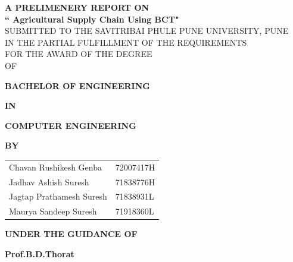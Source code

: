 \documentclass[oneside,a4paper,12pt]{report}
\begin{document}
\setlength{\parindent}{0mm}
\begin{center}
{\bfseries \fontsize{16}{14} \selectfont  A PRELIMENERY REPORT ON  \\}
 \vspace*{1.5\baselineskip}
{\bfseries \fontsize{16}{14} \selectfont `` Agricultural Supply Chain Using BCT"\\ \vspace*{1.5\baselineskip}}
{\fontsize{12}{12} \selectfont SUBMITTED TO THE SAVITRIBAI PHULE PUNE UNIVERSITY, PUNE\\
IN THE PARTIAL FULFILLMENT OF THE REQUIREMENTS  \\
FOR THE AWARD OF THE DEGREE \\
OF\\	
\vspace*{1\baselineskip}}

{\bfseries \fontsize{14}{12} \selectfont BACHELOR OF ENGINEERING\\
\vspace*{0.6\baselineskip}}

{\bfseries \fontsize{14}{12} \selectfont IN\\
\vspace*{0.6\baselineskip}}

{\bfseries \fontsize{14}{12} \selectfont COMPUTER ENGINEERING\\
\vspace*{1\baselineskip}}

{\bfseries \fontsize{12}{12} \selectfont  BY \\
\vspace*{0.5\baselineskip}}

\begin{tabular}{l l}
Chavan Rushikesh Genba & 72007417H\\
Jadhav Ashish Suresh & 71838776H\\
Jagtap Prathamesh Suresh  & 71838931L\\
Maurya Sandeep Suresh  & 71918360L\\
\end{tabular}

\vspace*{0.7\baselineskip}

{\bfseries \fontsize{14}{12} \selectfont UNDER THE GUIDANCE OF \\
\vspace*{0.5\baselineskip}}

{\bfseries \fontsize{14}{12} \selectfont Prof.B.D.Thorat \\
\vspace*{0.5\baselineskip}}


\end{center}
\end{document}

